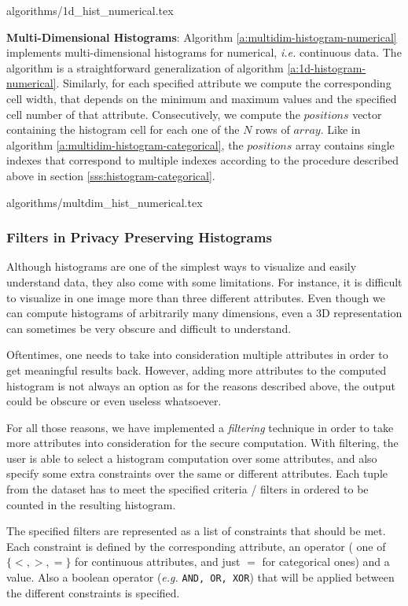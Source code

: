 {algorithms/1d_hist_numerical.tex}



\textbf{Multi-Dimensional Histograms}:
Algorithm \ref{a:multidim-histogram-numerical} implements multi\hyp dimensional histograms for numerical, \textit{i.e.} continuous data.
The algorithm is a straightforward generalization of algorithm \ref{a:1d-histogram-numerical}.
Similarly, for each specified attribute we compute the corresponding cell width, that depends on the minimum and maximum values and the specified cell number of that attribute.
Consecutively, we compute the $positions$ vector containing the histogram cell for each one of the $N$ rows of $array$.
Like in algorithm \ref{a:multidim-histogram-categorical}, the $positions$ array contains single indexes that correspond to multiple indexes according to the procedure described above in section \ref{sss:histogram-categorical}.


{algorithms/multdim_hist_numerical.tex}



\subsubsection{Filters in Privacy Preserving Histograms}\label{sss:histogram-filters}
Although histograms are one of the simplest ways to visualize and easily understand data, they also come with some limitations.
For instance, it is difficult to visualize in one image more than three different attributes.
Even though we can compute histograms of arbitrarily many dimensions, even a 3D representation can sometimes  be very obscure and difficult to understand.

Oftentimes, one needs to take into consideration multiple attributes in order to get meaningful results back.
However, adding more attributes to the computed histogram is not always an option as for the reasons described above, the output could be obscure or even useless whatsoever.

For all those reasons, we have implemented a \textit{filtering} technique in order to take more attributes into consideration for the secure computation.
With filtering, the user is able to select a histogram computation over some attributes, and also specify some extra constraints over the same or different attributes.
Each tuple from the dataset has to meet the specified criteria / filters in ordered to be counted in the resulting histogram.

The specified filters are represented as a list of constraints that should be met.
Each constraint is defined by the corresponding attribute, an operator ( one of $\{<, >, =\}$ for continuous attributes, and just $=$ for categorical ones) and a value.
Also a boolean operator (\textit{e.g.} \texttt{AND, OR, XOR}) that will be applied between the different constraints is specified.


